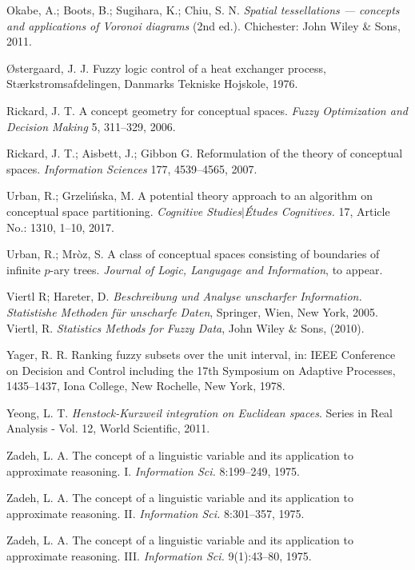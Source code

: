 \documentclass[leqno,12pt]{amsart}
\theoremstyle{remark}
\theoremstyle{remark}
\theoremstyle{remark}
\theoremstyle{definition}
\numberwithin{equation}{section}
\begin{document}
\begin{thebibliography}{111}
Okabe, A.; Boots, B.; Sugihara, K.; Chiu, S. N. {\em Spatial tessellations — concepts and applications
of Voronoi diagrams} (2nd ed.). Chichester: John Wiley \& Sons, 2011.

{\O}stergaard, J. J. Fuzzy logic control of a heat exchanger process, St{\ae}rkstromsafdelingen, Danmarks Tekniske Hojskole, 1976.

Rickard, J. T. A concept geometry for conceptual spaces. {\em Fuzzy Optimization and Decision Making} 5, 311--329, 2006.

Rickard, J. T.; Aisbett, J.; Gibbon G. Reformulation of the theory of conceptual spaces. {\em Information Sciences} 177, 4539--4565, 2007.

Urban, R.; Grzeli\'{n}ska, M. A potential theory approach to an algorithm on conceptual space partitioning. {\em Cognitive Studies$\mid$\'{E}tudes Cognitives.} 17, Article No.: 1310, 1--10, 2017.

Urban, R.; Mr\`{o}z, S. A class of conceptual spaces consisting of boundaries of infinite $p$-ary trees. {\em Journal of Logic, Langugage and Information}, to appear.

Viertl R; Hareter, D.
{\em Beschreibung und Analyse unscharfer Information. Statistishe
Methoden f\"ur unscharfe Daten}, Springer, Wien, New York, 2005.
Viertl, R. {\em  Statistics Methods for Fuzzy Data}, John Wiley \& Sons, (2010).

Yager, R. R. Ranking fuzzy subsets over the unit interval, in: IEEE Conference on Decision and Control including the 17th Symposium on Adaptive Processes, 1435--1437,
Iona College, New Rochelle, New York, 1978.

Yeong, L. T. {\em Henstock-Kurzweil integration on Euclidean spaces}. Series in Real Analysis - Vol. 12, World Scientific, 2011.

Zadeh, L. A. The concept of a linguistic variable and its application to approximate reasoning. I. {\em Information Sci.} 8:199--249, 1975.

Zadeh, L. A. The concept of a linguistic variable and its application to approximate reasoning. II. {\em Information Sci.} 8:301--357, 1975.

Zadeh, L. A. The concept of a linguistic variable and its application to approximate reasoning. III. {\em Information Sci.} 9(1):43--80, 1975.

\end{thebibliography}
\end{document}
